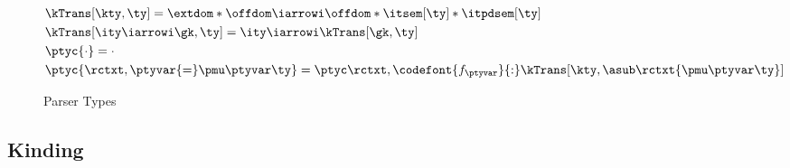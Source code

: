 \begin{figure}
\small
\fbox{$\kTrans[\gk,\ty] = \ity$} 
\fbox{$\ptyc{\rctxt} = \ctxt$} 
    
\begin{align*}
  &\kTrans[\kty,\ty] = \extdom * \offdom \iarrowi \offdom * \itsem[\ty] * \itpdsem[\ty]
   \\
   &\kTrans[\ity \iarrowi \gk,\ty] = \ity \iarrowi \kTrans[\gk,\ty]
\\
  &\ptyc{\cdot} = \cdot \\
  &\ptyc{\rctxt,\ptyvar{=}\pmu \ptyvar \ty} = \ptyc \rctxt,\codefont{f_\ptyvar}{:}
  \kTrans[\kty,\asub \rctxt {\pmu \ptyvar \ty}]
\end{align*}  
  \caption{Parser \Implang{} Types}
  \label{fig:parser-types}
\end{figure}

\subsection{\ddc{} Kinding}



